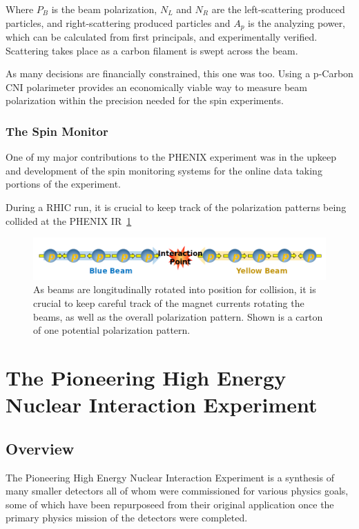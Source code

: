 Where $P_B$ is the beam polarization, $N_L$ and $N_R$ are the left-scattering
produced particles, and right-scattering produced particles and $A_p$ is the
analyzing power, which can be calculated from first principals, and
experimentally verified. Scattering takes place as a carbon filament is swept
across the beam.

As many decisions are financially constrained, this one was too. Using a
p-Carbon CNI polarimeter provides an economically viable way to measure beam
polarization within the precision needed for the spin experiments.

\subsubsection{The Spin Monitor}
\label{sec:the_spin_monitor}

One of my major contributions to the PHENIX experiment was in the upkeep and
development of the spin monitoring systems for the online data taking portions
of the experiment.

During a RHIC run, it is crucial to keep track of the polarization patterns
being collided at the PHENIX IR~\ref{fig:phenix_spin_collision}

\begin{figure}
  \centering
  \includegraphics[width=\linewidth]{./figures/phenix_spin_collision}
  \caption{
    As beams are longitudinally rotated into position for collision, it is
    crucial to keep careful track of the magnet currents rotating the beams, as
    well as the overall polarization pattern. Shown is a carton of one potential
    polarization pattern.
  }
  \label{fig:phenix_spin_collision}
\end{figure}


\clearpage
\section{The Pioneering High Energy Nuclear Interaction Experiment}
\label{sec:PHENIX}
\subsection{Overview}

The Pioneering High Energy Nuclear Interaction Experiment is a synthesis of many
smaller detectors all of whom were commissioned for various physics goals, some
of which have been repurposeed from their original application once the primary
physics mission of the detectors were completed.

